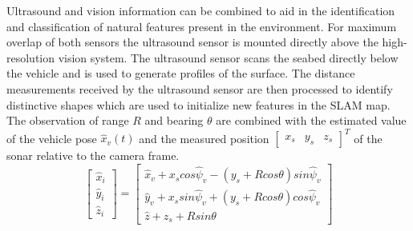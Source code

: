 Ultrasound and vision information can be combined to aid in the identification and classification of natural features present in the environment.
For maximum overlap of both sensors the ultrasound sensor is mounted directly above the high-resolution vision system.
The ultrasound sensor scans the seabed directly below the vehicle and is used to generate
profiles of the surface.
The distance measurements received by the ultrasound sensor are then processed to identify distinctive shapes which are used to initialize new features in the SLAM map.
The observation of range $R$ and bearing $\theta$ are combined with the estimated value of the vehicle pose $\hat{x}_v(t)$ and the measured position
$\left[ \begin{array}{ccc} \textit{x}_s & \textit{y}_s & \textit{z}_s \end{array}\right]^T$ of the sonar relative to the camera frame.
\begin{equation}
\left[ {
\begin{array}{c} \hat{\textit{x}}_i \\ \hat{\textit{y}}_i \\ \hat{\textit{z}}_i \end{array}
} \right] =
\left[ {
\begin{array}{c}
	\hat{\textit{x}}_v + \textit{x}_s cos \hat{\psi}_v - (\textit{y}_s + R cos \theta) sin \hat{\psi}_v \\
	\hat{\textit{y}}_v + \textit{x}_s sin \hat{\psi}_v + (\textit{y}_s + R cos \theta) cos \hat{\psi}_v \\
	\hat{\textit{z}} + \textit{z}_s + R sin \theta
\end{array}
} \right]
\end{equation}


